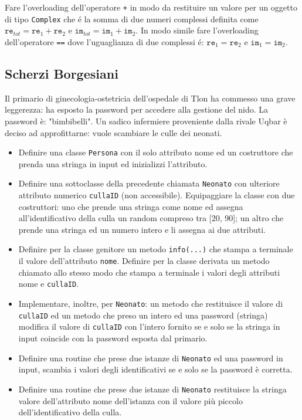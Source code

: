 \documentclass{article}
\begin{document}
Fare l'overloading dell'operatore \texttt{+} in modo da restituire un valore per un oggetto di tipo \texttt{Complex} che \'e la somma di due numeri complessi definita come $\texttt{re}_{tot} = \texttt{re}_1+\texttt{re}_2$ e $\texttt{im}_{tot} = \texttt{im}_1+\texttt{im}_2$. In modo simile fare l'overloading dell'operatore \texttt{==} dove l'uguaglianza di due complessi \'e: $\texttt{re}_1=\texttt{re}_2$ e $\texttt{im}_1=\texttt{im}_2$.


\subsection{Scherzi Borgesiani}
Il primario di ginecologia-ostetricia dell'ospedale di Tlon ha commesso una grave leggerezza: ha esposto la password per accedere alla gestione del nido. La password è: "bimbibelli". Un sadico infermiere proveniente dalla rivale Uqbar è deciso ad approfittarne: vuole scambiare le culle dei neonati.

\begin{itemize}

\item Definire una classe \texttt{Persona} con il solo attributo nome ed un costruttore che prenda una stringa in input ed inizializzi l'attributo.

\item Definire una sottoclasse della precedente chiamata \texttt{Neonato} con ulteriore attributo numerico \texttt{cullaID} (non accessibile). Equipaggiare la classe con due costruttori: uno che prende una stringa come nome ed assegna all'identificativo della culla un random compreso tra [20, 90]; un altro che prende una stringa ed un numero intero e li assegna ai due attributi.

\item Definire per la classe genitore un metodo \texttt{info(...)} che stampa a terminale il valore dell’attributo \texttt{nome}. Definire per la classe derivata un metodo chiamato allo stesso modo che stampa a terminale i valori degli attributi nome e \texttt{cullaID}.

\item Implementare, inoltre, per \texttt{Neonato}: un metodo che restituisce il valore di \texttt{cullaID} ed un metodo che preso un intero ed una password (stringa) modifica il valore di \texttt{cullaID} con l'intero fornito se e solo se la stringa in input coincide con la password esposta dal primario.

\item Definire una routine che prese due istanze di \texttt{Neonato} ed una password in input, scambia i valori degli identificativi se e solo se la password è corretta.

\item Definire una routine che prese due istanze di \texttt{Neonato} restituisce la stringa valore dell’attributo nome dell’istanza con il valore più piccolo dell’identificativo della culla.

\end{itemize}
\end{document}

